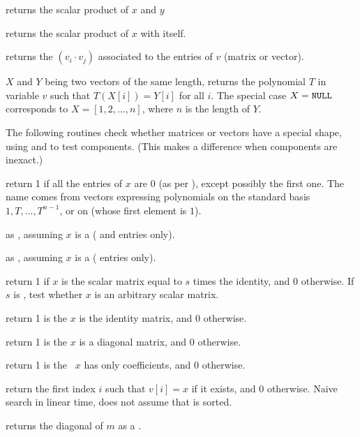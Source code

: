  returns the scalar product of $x$ and $y$

 returns the scalar product of $x$ with itself.

 returns the  $(v_i\cdot v_j)$
associated to the entries of $v$ (matrix or vector).

 $X$ and $Y$ being two vectors of
the same length, returns the polynomial $T$ in variable $v$ such that
$T(X[i]) = Y[i]$ for all $i$. The special case $X = {\tt NULL}$
corresponds to $X = [1,2,\dots,n]$, where $n$ is the length of $Y$.


The following routines check whether matrices or vectors have a special
shape, using  and  to test components. (This makes
a difference when components are inexact.)

 return 1 if all the entries of $x$ are $0$
(as per ), except possibly the first one. The name comes from
vectors expressing polynomials on the standard basis $1,T,\dots, T^{n-1}$, or
on  (whose first element is $1$).

 as , assuming $x$ is a
 ( and  entries only).

 as , assuming $x$ is a
 ( entries only).

 return 1 if $x$ is the scalar matrix
equal to $s$ times the identity, and 0 otherwise. If $s$ is , test
whether $x$ is an arbitrary scalar matrix.

 return 1 is the  $x$ is the
identity matrix, and 0 otherwise.

 return 1 is the  $x$ is a
diagonal matrix, and 0 otherwise.

 return 1 is the ~$x$ has only
 coefficients, and 0 otherwise.

 return the first index $i$ such that
$v[i] = x$ if it exists, and $0$ otherwise. Naive search in linear time, does
not assume that  is sorted.

 returns the diagonal of $m$ as a .

